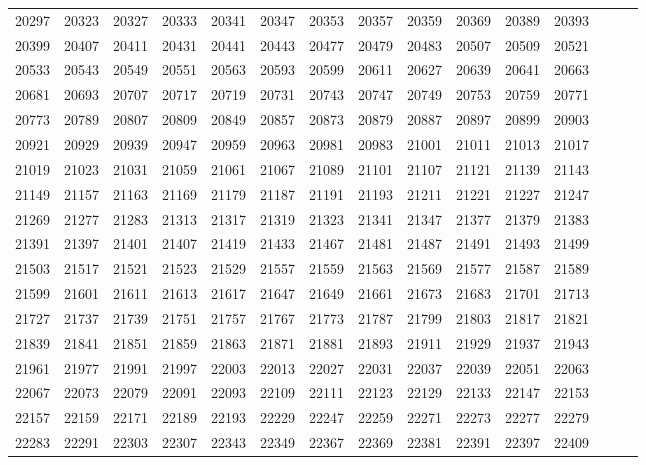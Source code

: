 \documentclass[10pt, a4paper]{article}
\begin{document}
\begin{center}
\begin{longtable}{c c c c c c c c c c c c c c c}
        20297 & 20323 & 20327 & 20333 & 20341 & 20347 & 20353 & 20357 & 20359 & 20369 & 20389 & 20393 \\
        20399 & 20407 & 20411 & 20431 & 20441 & 20443 & 20477 & 20479 & 20483 & 20507 & 20509 & 20521 \\
        20533 & 20543 & 20549 & 20551 & 20563 & 20593 & 20599 & 20611 & 20627 & 20639 & 20641 & 20663 \\
        20681 & 20693 & 20707 & 20717 & 20719 & 20731 & 20743 & 20747 & 20749 & 20753 & 20759 & 20771 \\
        20773 & 20789 & 20807 & 20809 & 20849 & 20857 & 20873 & 20879 & 20887 & 20897 & 20899 & 20903 \\
        20921 & 20929 & 20939 & 20947 & 20959 & 20963 & 20981 & 20983 & 21001 & 21011 & 21013 & 21017 \\
        21019 & 21023 & 21031 & 21059 & 21061 & 21067 & 21089 & 21101 & 21107 & 21121 & 21139 & 21143 \\
        21149 & 21157 & 21163 & 21169 & 21179 & 21187 & 21191 & 21193 & 21211 & 21221 & 21227 & 21247 \\
        21269 & 21277 & 21283 & 21313 & 21317 & 21319 & 21323 & 21341 & 21347 & 21377 & 21379 & 21383 \\
        21391 & 21397 & 21401 & 21407 & 21419 & 21433 & 21467 & 21481 & 21487 & 21491 & 21493 & 21499 \\
        21503 & 21517 & 21521 & 21523 & 21529 & 21557 & 21559 & 21563 & 21569 & 21577 & 21587 & 21589 \\
        21599 & 21601 & 21611 & 21613 & 21617 & 21647 & 21649 & 21661 & 21673 & 21683 & 21701 & 21713 \\
        21727 & 21737 & 21739 & 21751 & 21757 & 21767 & 21773 & 21787 & 21799 & 21803 & 21817 & 21821 \\
        21839 & 21841 & 21851 & 21859 & 21863 & 21871 & 21881 & 21893 & 21911 & 21929 & 21937 & 21943 \\
        21961 & 21977 & 21991 & 21997 & 22003 & 22013 & 22027 & 22031 & 22037 & 22039 & 22051 & 22063 \\
        22067 & 22073 & 22079 & 22091 & 22093 & 22109 & 22111 & 22123 & 22129 & 22133 & 22147 & 22153 \\
        22157 & 22159 & 22171 & 22189 & 22193 & 22229 & 22247 & 22259 & 22271 & 22273 & 22277 & 22279 \\
        22283 & 22291 & 22303 & 22307 & 22343 & 22349 & 22367 & 22369 & 22381 & 22391 & 22397 & 22409 \\

\end{longtable}
\end{center}
\end{document}
